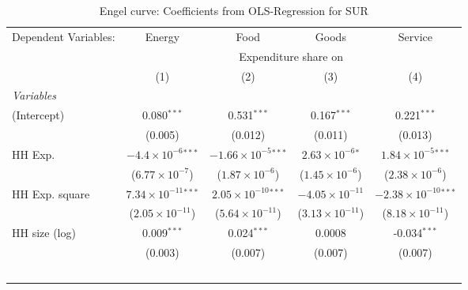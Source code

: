 
\begin{table}[htbp!]
   \centering
   \small
   \begin{adjustbox}{width = 1\textwidth, max height = 0.95\textheight, center}
      \begin{threeparttable}[b]
         \caption{\label{tab:Engel_parametric_SUR} Engel curve: Coefficients from OLS-Regression for SUR}
         \begin{tabular}{lcccc}
            \tabularnewline \midrule \midrule
            Dependent Variables: & Energy                         & Food                           & Goods                       & Service\\  
             & \multicolumn{4}{c}{Expenditure share on} \\ 
                                 & (1)                            & (2)                            & (3)                         & (4)\\  
            \midrule
            \emph{Variables}\\
            (Intercept)          & 0.080$^{***}$                  & 0.531$^{***}$                  & 0.167$^{***}$               & 0.221$^{***}$\\   
                                 & (0.005)                        & (0.012)                        & (0.011)                     & (0.013)\\   
            HH Exp.              & $-4.4\times 10^{-6}$$^{***}$   & $-1.66\times 10^{-5}$$^{***}$  & $2.63\times 10^{-6}$$^{*}$  & $1.84\times 10^{-5}$$^{***}$\\    
                                 & ($6.77\times 10^{-7}$)         & ($1.87\times 10^{-6}$)         & ($1.45\times 10^{-6}$)      & ($2.38\times 10^{-6}$)\\    
            HH Exp. square       & $7.34\times 10^{-11}$$^{***}$  & $2.05\times 10^{-10}$$^{***}$  & $-4.05\times 10^{-11}$      & $-2.38\times 10^{-10}$$^{***}$\\    
                                 & ($2.05\times 10^{-11}$)        & ($5.64\times 10^{-11}$)        & ($3.13\times 10^{-11}$)     & ($8.18\times 10^{-11}$)\\    
            HH size (log)        & 0.009$^{***}$                  & 0.024$^{***}$                  & 0.0008                      & -0.034$^{***}$\\   
                                 & (0.003)                        & (0.007)                        & (0.007)                     & (0.007)\\   
$$
\end{tabular}
\end{threeparttable}
\end{adjustbox}
\end{table}
